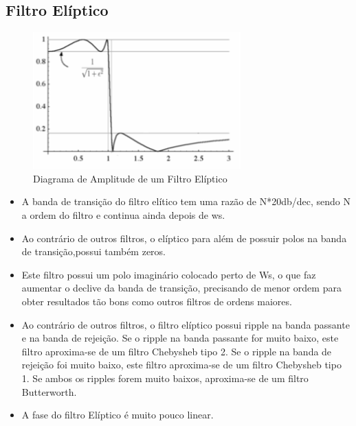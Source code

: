 \documentclass[11pt]{article}
\begin{document}
\subsection{Filtro Elíptico}
\begin{figure}[h]
\begin{center}
\includegraphics[width=8cm]{elitico1.png}
\caption{Diagrama de Amplitude de um Filtro Elíptico}
\label{figura5}
\end{center}
\end{figure}
\begin{itemize}
\item{A banda de transição do filtro elítico tem uma razão de N*20db/dec, sendo N a ordem do filtro e continua ainda depois de ws.}
\item{Ao contrário de outros filtros, o elíptico para além de possuir polos na banda de transição,possui também zeros.}
\item{Este filtro possui um polo imaginário colocado perto de Ws, o que faz aumentar o declive da banda de transição, precisando de menor ordem para obter resultados tão bons como outros filtros de ordens maiores.}
\item{Ao contrário de outros filtros, o filtro elíptico possui ripple na banda passante e na banda de rejeição. Se o ripple na banda passante for muito baixo, este filtro aproxima-se de um filtro Chebysheb tipo 2. Se o ripple na banda de rejeição foi muito baixo, este filtro aproxima-se de um filtro Chebysheb tipo 1. Se ambos os ripples forem muito baixos, aproxima-se de um filtro Butterworth.}
\item{A fase do filtro Elíptico é  muito pouco linear.}

\end{itemize}

\newpage
\end{document}
